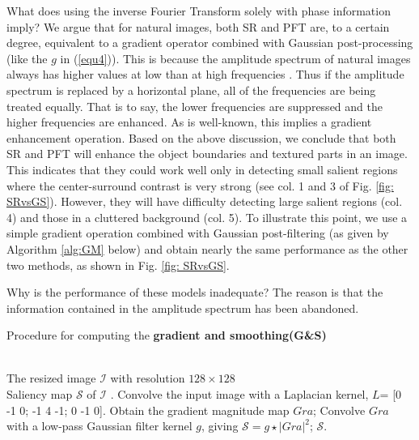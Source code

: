 \documentclass[10pt,journal,cspaper,compsoc]{IEEEtran}
\begin{document}
What does using the inverse Fourier Transform solely with phase information imply? We argue that for natural images, both SR and PFT are, to a certain degree, equivalent to a gradient operator combined with Gaussian post-processing (like the $g$ in (\ref{equ4})). This is because the amplitude spectrum of natural images always has higher values at low than at high frequencies \cite{ruderman1994statistics, srivastava2003advances}. Thus if the amplitude spectrum is replaced by a horizontal plane, all of the frequencies are being treated equally. That is to say, the lower frequencies are suppressed and the higher frequencies are enhanced. As is well-known, this implies a gradient enhancement operation. Based on the above discussion, we conclude that both SR and PFT will enhance the object boundaries and textured parts in an image. This indicates that they could work well only in detecting small salient regions where the center-surround contrast is very strong (see col. 1 and 3 of Fig. \ref{fig: SRvsGS}). However, they will have difficulty detecting large salient regions (col. 4) and those in a cluttered background  (col. 5). To illustrate this point, we use a simple gradient operation combined with Gaussian post-filtering (as given by Algorithm \ref{alg:GM} below) and obtain nearly the same performance as the other two methods, as shown in Fig. \ref{fig: SRvsGS}.

Why is the performance of these models inadequate? The reason is that the information contained in the amplitude spectrum has been abandoned.
\begin{algorithm}[htb]         \caption{Procedure for computing the {\bf gradient and smoothing(G\&S)} }             \label{alg:GM}                  \begin{algorithmic}[1]                \REQUIRE ~~\\                          The resized image ${\mathcal I}$ with resolution $128\times128$
\ENSURE ~~\\                           Saliency map ${\mathcal S}$ of ${\mathcal I}$ .
\vspace{0.15cm}
\STATE Convolve the input image with a Laplacian kernel, $ L$= [0 -1 0; -1 4 -1; 0 -1 0]. Obtain the gradient magnitude map $Gra$;
\STATE Convolve $Gra$ with a low-pass Gaussian filter kernel $g$, giving ${\mathcal S}=g{\star}|Gra|^2$;
\RETURN ${\mathcal S}$.                \end{algorithmic}
\end{algorithm}
\end{document}
